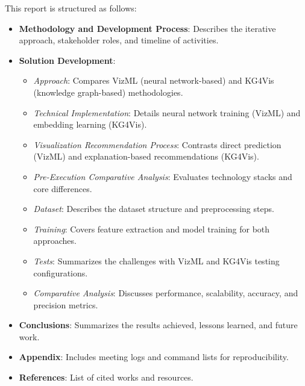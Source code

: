 This report is structured as follows:

\begin{itemize}
    \item \textbf{Methodology and Development Process}: Describes the iterative approach, stakeholder roles, and timeline of activities.
    
    \item \textbf{Solution Development}:
    \begin{itemize}
        \item \textit{Approach}: Compares VizML (neural network-based) and KG4Vis (knowledge graph-based) methodologies.
        \item \textit{Technical Implementation}: Details neural network training (VizML) and embedding learning (KG4Vis).
        \item \textit{Visualization Recommendation Process}: Contrasts direct prediction (VizML) and explanation-based recommendations (KG4Vis).
        \item \textit{Pre-Execution Comparative Analysis}: Evaluates technology stacks and core differences.
        \item \textit{Dataset}: Describes the dataset structure and preprocessing steps.
        \item \textit{Training}: Covers feature extraction and model training for both approaches.
        \item \textit{Tests}: Summarizes the challenges with VizML and KG4Vis testing configurations.
        \item \textit{Comparative Analysis}: Discusses performance, scalability, accuracy, and precision metrics.
    \end{itemize}
    
    \item \textbf{Conclusions}: Summarizes the results achieved, lessons learned, and future work.
    
    \item \textbf{Appendix}: Includes meeting logs and command lists for reproducibility.
    
    \item \textbf{References}: List of cited works and resources.
\end{itemize}

